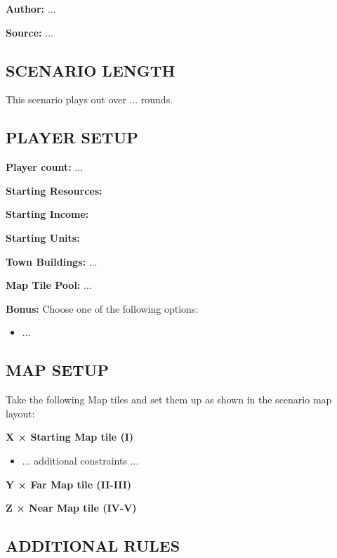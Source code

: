 
\begin{multicols*}{2}

\textbf{Author:} ...

\textbf{Source:} ...

\subsection*{\MakeUppercase{Scenario length}}

This scenario plays out over ... rounds.

\subsection*{\MakeUppercase{Player setup}}

\textbf{Player count:} ...

\textbf{Starting Resources:}   

\textbf{Starting Income:}   

\textbf{Starting Units:}    

\textbf{Town Buildings:} ...

\textbf{Map Tile Pool:} ...

\textbf{Bonus:} Choose one of the following options: 

\begin{itemize}
    \item ...
\end{itemize}

\subsection*{\MakeUppercase{Map setup}}

Take the following Map tiles and set them up as shown in the scenario map layout:

\textbf{X × Starting Map tile (I)}
\begin{itemize}
    \item ... additional constraints ...
\end{itemize}

\textbf{Y × Far Map tile (II-III)}

\textbf{Z × Near Map tile (IV-V)}

\subsection*{\MakeUppercase{Additional rules}}


\end{multicols*}
